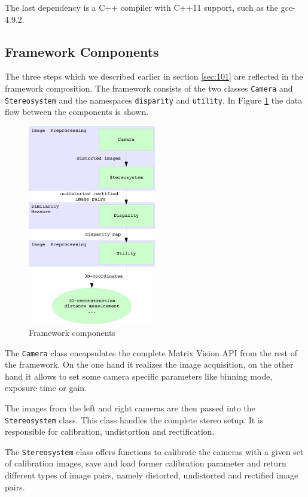 \documentclass[11pt]{article}
\begin{document}
The last dependency is a C++ compiler with C++11 support, such as the gcc-4.9.2.

\subsection{Framework Components}
The three steps which we described earlier in section \ref{sec:101} are reflected in the framework composition. The framework consists of the two classes \texttt{Camera} and \texttt{Stereosystem} and the namespaces \texttt{disparity} and \texttt{utility}. In Figure \ref{fig:framework} the data flow between the components is shown.

\begin{figure}[H]
        \centering
        \includegraphics[width=0.5\textwidth]{images/graph_composition}
        \caption{Framework components}
        \label{fig:framework}
\end{figure}

The \texttt{Camera} class encapsulates the complete Matrix Vision API from the rest of the framework. On the one hand it realizes the image acquisition, on the other hand it allows to set some camera specific parameters like binning mode, exposure time or gain.

The images from the left and right cameras are then passed into the \texttt{Stereosystem} class. This class handles the complete stereo setup. It is responsible for calibration, undistortion and rectification. 

The \texttt{Stereosystem} class offers functions to calibrate the cameras with a given set of calibration images, save and load former calibration parameter and return different types of image pairs, namely distorted, undistorted and rectified image pairs.
\end{document}
